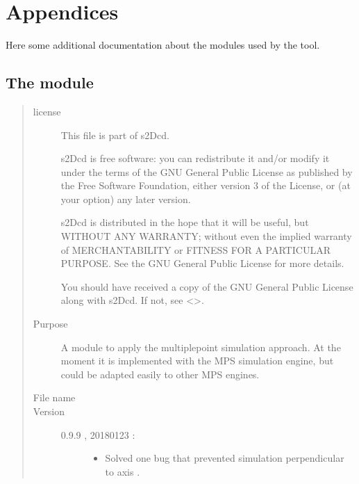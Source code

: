 \documentclass[letterpaper,10pt,english]{sphinxmanual}
\begin{document}
\chapter{Appendices}
\label{\detokenize{appendices:appendices}}\label{\detokenize{appendices:id1}}\label{\detokenize{appendices::doc}}
Here some additional documentation about the  modules used by
the  tool.


\section{The  module}
\label{\detokenize{appendices:module-s2Dcd.s2Dcd}}\label{\detokenize{appendices:the-s2dcd-module}}\begin{quote}\begin{description}
\item[{license}] \leavevmode
This file is part of s2Dcd.

s2Dcd is free software: you can redistribute it and/or modify
it under the terms of the GNU General Public License as published by
the Free Software Foundation, either version 3 of the License, or
(at your option) any later version.

s2Dcd is distributed in the hope that it will be useful,
but WITHOUT ANY WARRANTY; without even the implied warranty of
MERCHANTABILITY or FITNESS FOR A PARTICULAR PURPOSE.  See the
GNU General Public License for more details.

You should have received a copy of the GNU General Public License
along with s2Dcd.  If not, see \textless{}\textgreater{}.

\item[{Purpose}] \leavevmode
A module to apply the  multiple\sphinxhyphen{}point simulation approach.
At the moment it is implemented with the  MPS simulation engine,
but could be adapted easily to other MPS engines.

\item[{File name}] \leavevmode
{}

\item[{Version}] \leavevmode\begin{description}
\item[{0.9.9 , 2018\sphinxhyphen{}01\sphinxhyphen{}23 :}] \leavevmode\begin{itemize}
\item {} 
Solved one bug that prevented simulation perpendicular
to axis .


\end{itemize}
\end{description}
\end{description}
\end{quote}
\end{document}
